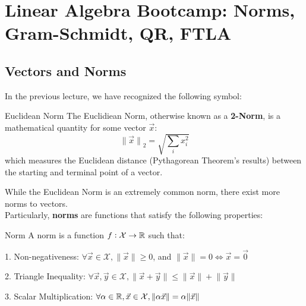 \chapter{
    Linear Algebra Bootcamp: Norms, Gram-Schmidt, QR, FTLA
}

\section{Vectors and Norms}
In the previous lecture, we have recognized the following symbol:
\begin{ln-symbol}{Euclidean Norm}{}
    The Euclidiean Norm, otherwise known as a \textbf{2-Norm}, is a mathematical quantity for some vector $\vec{x}$:
    \[
        {\lVert \vec{x} \rVert}_2 = \sqrt{\sum_i x_i^2}
    \]
    which measures the Euclidean distance (Pythagorean Theorem's results) between the starting and terminal point of a vector.
\end{ln-symbol}
While the Euclidean Norm is an extremely common norm, there exist more norms to vectors. \\
Particularly, \textbf{norms} are functions that satisfy the following properties:
\begin{ln-define}{Norm}{}
    A norm is a function $f: \mathcal{X} \rightarrow \mathbb{R}$ such that:
    \begin{bindenum}
        \item[1.] Non-negativeness: $\forall \vec{x} \in \mathcal{X}, \lVert \vec{x} \rVert \geq 0$, and $\lVert \vec{x} \rVert = 0 \iff \vec{x} = \vec{0}$
        \item[2.] Triangle Inequality: $\forall \vec{x}, \vec{y} \in \mathcal{X}, \lVert \vec{x} + \vec{y} \rVert \leq \lVert \vec{x} \rVert + \lVert \vec{y} \rVert$
        \item[3.] Scalar Multiplication: $\forall \alpha \in \mathbb{R}, \vec{x} \in \mathcal{X}, \lVert \alpha \vec{x} \rVert = \alpha \lVert \vec{x} \rVert$
    \end{bindenum}
\end{ln-define}

